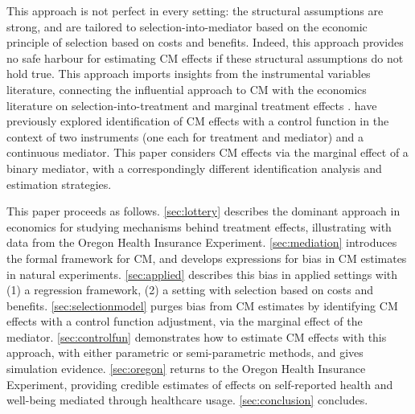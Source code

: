 This approach is not perfect in every setting: the structural assumptions are strong, and are tailored to selection-into-mediator based on the economic principle of selection based on costs and benefits.
Indeed, this approach provides no safe harbour for estimating CM effects if these structural assumptions do not hold true.
This approach imports insights from the instrumental variables literature, connecting the influential \cite{imai2010identification} approach to CM with the economics literature on selection-into-treatment and marginal treatment effects \citep{vytlacil2002independence,heckman2004using,heckman2005structural,florens2008identification,kline2019heckits}.
\cite{frolich2017direct} have previously explored identification of CM effects with a control function in the context of two instruments (one each for treatment and mediator) and a continuous mediator.
This paper considers CM effects via the marginal effect of a binary mediator, with a correspondingly different identification analysis and estimation strategies.

This paper proceeds as follows.
\autoref{sec:lottery} describes the dominant approach in economics for studying mechanisms behind treatment effects, illustrating with data from the Oregon Health Insurance Experiment.
\autoref{sec:mediation} introduces the formal framework for CM, and develops expressions for bias in CM estimates in natural experiments.
\autoref{sec:applied} describes this bias in applied settings with (1) a regression framework, (2) a setting with selection based on costs and benefits.
\autoref{sec:selectionmodel} purges bias from CM estimates by identifying CM effects with a control function adjustment, via the marginal effect of the mediator.
\autoref{sec:controlfun} demonstrates how to estimate CM effects with this approach, with either parametric or semi-parametric methods, and gives simulation evidence.
\autoref{sec:oregon} returns to the Oregon Health Insurance Experiment, providing credible estimates of effects on self-reported health and well-being mediated through healthcare usage.
\autoref{sec:conclusion} concludes.
